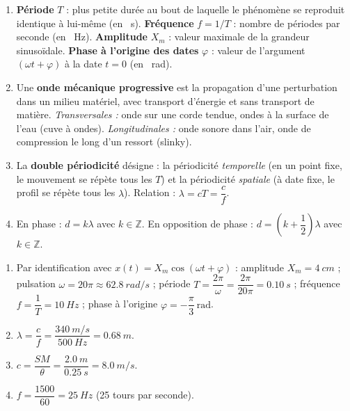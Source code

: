 \documentclass[11pt]{article}
\begin{document}
\begin{corrige}
\begin{enumerate}
\item \textbf{Période} $T$ : plus petite durée au bout de laquelle le phénomène se reproduit identique à lui-même (en \SI{}{s}). \textbf{Fréquence} $f = 1/T$ : nombre de périodes par seconde (en \SI{}{Hz}). \textbf{Amplitude} $X_m$ : valeur maximale de la grandeur sinusoïdale. \textbf{Phase à l'origine des dates} $\varphi$ : valeur de l'argument $(\omega t + \varphi)$ à la date $t = 0$ (en \SI{}{rad}).
\item Une \textbf{onde mécanique progressive} est la propagation d'une perturbation dans un milieu matériel, avec transport d'énergie et sans transport de matière. \emph{Transversales :} onde sur une corde tendue, ondes à la surface de l'eau (cuve à ondes). \emph{Longitudinales :} onde sonore dans l'air, onde de compression le long d'un ressort (slinky).
\item La \textbf{double périodicité} désigne : la périodicité \emph{temporelle} (en un point fixe, le mouvement se répète tous les $T$) et la périodicité \emph{spatiale} (à date fixe, le profil se répète tous les $\lambda$). Relation : $\lambda = cT = \dfrac{c}{f}$.
\item En phase : $d = k\lambda$ avec $k \in \mathbb{Z}$. En opposition de phase : $d = \left(k + \dfrac{1}{2}\right)\lambda$ avec $k \in \mathbb{Z}$.
\end{enumerate}
\end{corrige}

\begin{corrige}
\begin{enumerate}
\item Par identification avec $x(t) = X_m\cos(\omega t + \varphi)$ : amplitude $X_m = \SI{4}{cm}$ ; pulsation $\omega = 20\pi \approx \SI{62,8}{rad/s}$ ; période $T = \dfrac{2\pi}{\omega} = \dfrac{2\pi}{20\pi} = \SI{0,10}{s}$ ; fréquence $f = \dfrac{1}{T} = \SI{10}{Hz}$ ; phase à l'origine $\varphi = -\dfrac{\pi}{3}\ \text{rad}$.
\item $\lambda = \dfrac{c}{f} = \dfrac{\SI{340}{m/s}}{\SI{500}{Hz}} = \SI{0,68}{m}$.
\item $c = \dfrac{SM}{\theta} = \dfrac{\SI{2,0}{m}}{\SI{0,25}{s}} = \SI{8,0}{m/s}$.
\item $f = \dfrac{1500}{60} = \SI{25}{Hz}$ (25 tours par seconde).
\end{enumerate}
\end{corrige}
\end{document}
